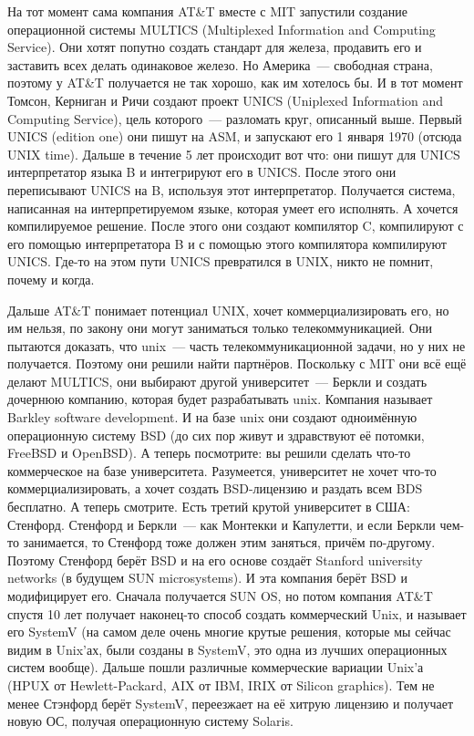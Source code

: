 \documentclass{article}
\begin{document}
    На тот момент сама компания AT\&T вместе с MIT запустили создание операционной системы MULTICS (Multiplexed Information and Computing Service). Они хотят попутно создать стандарт для железа, продавить его и заставить всех делать одинаковое железо. Но Америка~--- свободная страна, поэтому у AT\&T получается не так хорошо, как им хотелось бы. И в тот момент Томсон, Керниган и Ричи создают проект UNICS (Uniplexed Information and Computing Service), цель которого~--- разломать круг, описанный выше. Первый UNICS (edition one) они пишут на ASM, и запускают его 1 января 1970 (отсюда UNIX time). Дальше в течение 5 лет происходит вот что: они пишут для UNICS интерпретатор языка B и интегрируют его в UNICS. После этого они переписывают UNICS на B, используя этот интерпретатор. Получается система, написанная на интерпретируемом языке, которая умеет его исполнять. А хочется компилируемое решение. После этого они создают компилятор C, компилируют с его помощью интерпретатора B и с помощью этого компилятора компилируют UNICS. Где-то на этом пути UNICS превратился в UNIX, никто не помнит, почему и когда.
    
    Дальше AT\&T понимает потенциал UNIX, хочет коммерциализировать его, но им нельзя, по закону они могут заниматься только телекоммуникацией. Они пытаются доказать, что unix~--- часть телекоммуникационной задачи, но у них не получается. Поэтому они решили найти партнёров. Поскольку с MIT они всё ещё делают MULTICS, они выбирают другой университет~--- Беркли и создать дочернюю компанию, которая будет разрабатывать unix. Компания называет Barkley software development. И на базе unix они создают одноимённую операционную систему BSD (до сих пор живут и здравствуют её потомки, FreeBSD и OpenBSD). А теперь посмотрите: вы решили сделать что-то коммерческое на базе университета. Разумеется, университет не хочет что-то коммерциализировать, а хочет создать BSD-лицензию и раздать всем BDS бесплатно. А теперь смотрите. Есть третий крутой университет в США: Стенфорд. Стенфорд и Беркли~--- как Монтекки и Капулетти, и если Беркли чем-то занимается, то Стенфорд тоже должен этим заняться, причём по-другому. Поэтому Стенфорд берёт BSD и на его основе создаёт Stanford university networks (в будущем SUN microsystems). И эта компания берёт BSD и модифицирует его. Сначала получается SUN OS, но потом компания AT\&T спустя 10 лет получает наконец-то способ создать коммерческий Unix, и называет его SystemV (на самом деле очень многие крутые решения, которые мы сейчас видим в Unix'ах, были созданы в SystemV, это одна из лучших операционных систем вообще). Дальше пошли различные коммерческие вариации Unix'а (HPUX от Hewlett-Packard, AIX от IBM, IRIX от Silicon graphics). Тем не менее Стэнфорд берёт SystemV, переезжает на её хитрую лицензию и получает новую ОС, получая операционную систему Solaris.
    
\end{document}
